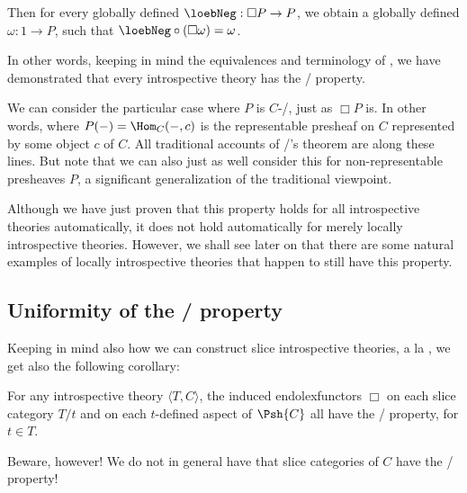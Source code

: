 Then for every globally defined $\loebNeg : \Box P \to P$, we obtain a globally defined $\omega : 1 \to P$, such that $\loebNeg \circ (\Box \omega) = \omega$.

In other words, keeping in mind the equivalences and terminology of , we have demonstrated that every introspective theory has the \Loeb/ property.

We can consider the particular case where $P$ is $C$-\repsmall/, just as $\Box P$ is. In other words, where $P(-) = \Hom_C(-, c)$ is the representable presheaf on $C$ represented by some object $c$ of $C$. All traditional accounts of \Loeb/'s theorem are along these lines. But note that we can also just as well consider this  for non-representable presheaves $P$, a significant generalization of the traditional viewpoint.

Although we have just proven that this property holds for all introspective theories automatically, it does not hold automatically for merely locally introspective theories. However, we shall see later on that there are some natural examples of locally introspective theories that happen to still have this property. 

\subsection{Uniformity of the \Loeb/ property}
Keeping in mind also how we can construct slice introspective theories, a la , we get also the following corollary:
\begin{corollary}\label{IntrospTransfersEverywhere}
For any introspective theory $\langle T, C \rangle$, the induced endolexfunctors $\Box$ on each slice category $T/t$ and on each $t$-defined aspect of $\Psh{C}$ all have the \Loeb/ property, for $t \in T$.
\end{corollary}

Beware, however! We do not in general have that slice categories of $C$ have the \Loeb/ property! 

